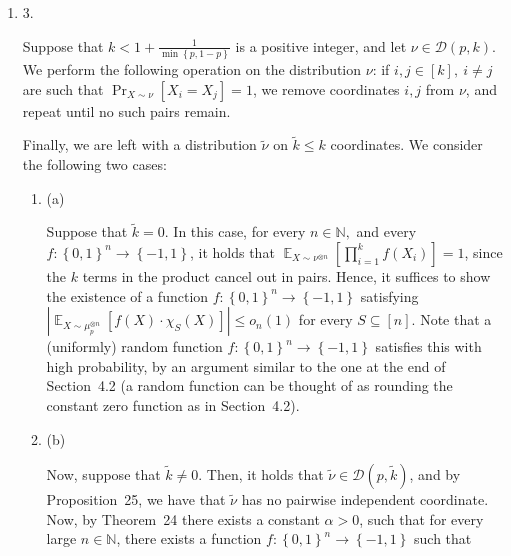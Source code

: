 \begin{enumerate}
\begin{enumerate}
\end{enumerate}


The result now follows by Theorem 33.\par





\item[] 
3. 


Suppose that $k<1+\frac{1}{\min\left\{p,1-p\right\}}$ is a positive integer, and let $\nu\in\mathcal{D}(p,k)$.
We perform the following operation on the distribution $\nu$:
if $i,j\in[k],\ i\not=j$ are such that $\Pr_{X\sim\nu}[X_{i}=X_{j}]=1$, we remove coordinates $i,j$ from $\nu$, and repeat until no such pairs remain.\par




Finally, we are left with a distribution $\tilde{\nu}$ on $\tilde{k}\leqslant k$ coordinates. We consider the following two cases:\par


\begin{enumerate}


\item[] 
(a) 


Suppose that $\tilde{k}=0$. In this case, for every $n\in\mathbb{N},$ and every $f:\left\{0,1\right\}^{n}\to\left\{-1,1\right\}$, it holds that $\mathop{\mathbb{E}}_{X\sim\nu^{\otimes n}}\left[\prod_{i=1}^{k}f(X_{i})\right]=1$, since the $k$ terms in the product cancel out in pairs.
Hence, it suffices to show the existence of a function $f:\left\{0,1\right\}^{n}\to\left\{-1,1\right\}$ satisfying $\left|\mathop{\mathbb{E}}_{X\sim\mu_{p}^{\otimes n}}\left[f(X)\cdot\chi_{S}(X)\right]\right|\leqslant o_{n}(1)$ for every $S\subseteq[n]$.
Note that a (uniformly) random function $f:\left\{0,1\right\}^{n}\to\left\{-1,1\right\}$ satisfies this with high probability, by an argument similar to the one at the end of Section 4.2 (a random function can be thought of as rounding the constant zero function as in Section 4.2).\par





\item[] 
(b) 


Now, suppose that $\tilde{k}\not=0$.
Then, it holds that $\tilde{\nu}\in\mathcal{D}(p,\tilde{k})$, and by Proposition 25, we have that $\tilde{\nu}$ has no pairwise independent coordinate.
Now, by Theorem 24 there exists a constant $\alpha>0$, such that for every large $n\in\mathbb{N}$, there exists a function $f:\left\{0,1\right\}^{n}\to\left\{-1,1\right\}$ such that\par



\end{enumerate}
\end{enumerate}

